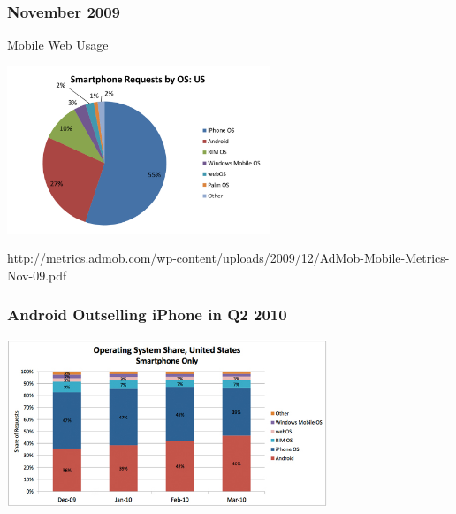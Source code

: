 \documentclass{beamer}
\begin{document}
\begin{frame}
\frametitle{November 2009}

\begin{center}
\begin{large}
 Mobile Web Usage
\end{large}

\hspace{0.2cm}

\includegraphics[height=5.0cm]{figs/admob-android-2009}


                  {http://metrics.admob.com/wp-content/uploads/2009/12/AdMob-Mobile-Metrics-Nov-09.pdf}

\end{center}

\end{frame}

\begin{frame}
\frametitle{Android Outselling iPhone in Q2 2010}

\begin{center}
\hspace{0.2cm}

\includegraphics[height=5.0cm]{figs/iphoneosvsandroid-marzo}

\hspace{0.2cm}
\end{center}

\end{frame}
\end{document}
